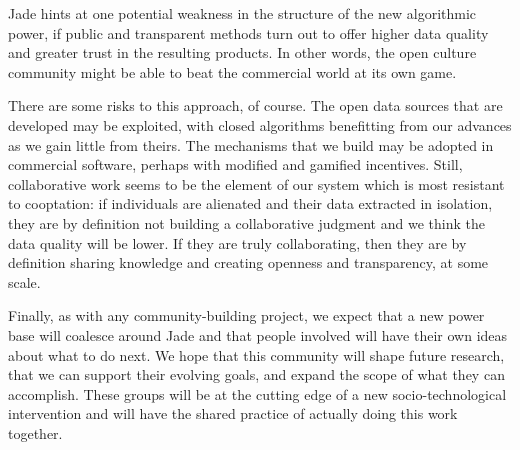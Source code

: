 \documentclass[sigconf, anonymous, review]{acmart}
\begin{document}
Jade hints at one potential weakness in the structure of the new algorithmic power, if public and transparent methods turn out to offer higher data quality and greater trust in the resulting products.  In other words, the open culture community might be able to beat the commercial world at its own game.

There are some risks to this approach, of course.  The open data sources that are developed may be exploited, with closed algorithms benefitting from our advances as we gain little from theirs.  The mechanisms that we build may be adopted in commercial software, perhaps with modified and gamified incentives.  Still, collaborative work seems to be the element of our system which is most resistant to cooptation: if individuals are alienated and their data extracted in isolation, they are by definition not building a collaborative judgment and we think the data quality will be lower.  If they are truly collaborating, then they are by definition sharing knowledge and creating openness and transparency, at some scale.

Finally, as with any community-building project, we expect that a new power base will coalesce around Jade and that people involved will have their own ideas about what to do next.  We hope that this community will shape future research, that we can support their evolving goals, and expand the scope of what they can accomplish.  These groups will be at the cutting edge of a new socio-technological intervention and will have the shared practice of actually doing this work together.

\balance{}



\end{document}
